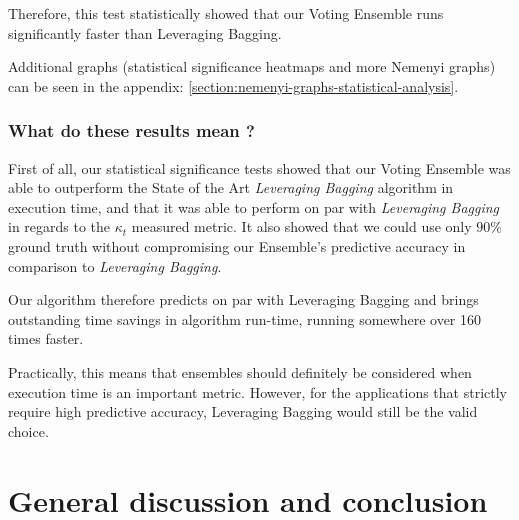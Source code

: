 Therefore, this test statistically showed that our Voting Ensemble runs significantly faster than Leveraging Bagging.

Additional graphs (statistical significance heatmaps and more Nemenyi graphs) can be seen in the appendix: \ref{section:nemenyi-graphs-statistical-analysis}.

\subsubsection{What do these results mean ?}
First of all, our statistical significance tests showed that our Voting Ensemble was able to outperform the State of the Art \textit{Leveraging Bagging} algorithm in execution time, and that it was able to perform on par with \textit{Leveraging Bagging} in regards to the $\kappa_t$ measured metric. It also showed that we could use only $90\%$ ground truth without compromising our Ensemble's predictive accuracy in comparison to \textit{Leveraging Bagging}.

Our algorithm therefore predicts on par with Leveraging Bagging and brings outstanding time savings in algorithm run-time, running somewhere over 160 times faster.

Practically, this means that ensembles should definitely be considered when execution time is an important metric. However, for the applications that strictly require high predictive accuracy, Leveraging Bagging would still be the valid choice.

\section{General discussion and conclusion}
